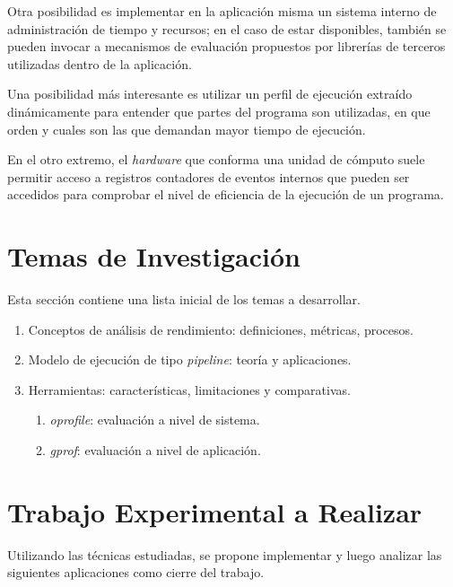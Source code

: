 \documentclass[a4paper]{article}
\begin{document}
\smallskip

Otra posibilidad es implementar en la aplicaci\'on misma un sistema interno de
administraci\'on de tiempo y recursos; en el caso de estar disponibles,
tambi\'en se pueden invocar a mecanismos de evaluaci\'on propuestos por
librer\'ias de terceros utilizadas dentro de la aplicaci\'on.

\smallskip

Una posibilidad m\'as interesante es utilizar un perfil de ejecuci\'on
extra\'ido din\'amicamente para entender que partes del programa son
utilizadas, en que orden y cuales son las que demandan mayor tiempo de
ejecuci\'on.

\smallskip

En el otro extremo, el {\it hardware} que conforma una unidad de c\'omputo
suele permitir acceso a registros contadores de eventos internos que pueden
ser accedidos para comprobar el nivel de eficiencia de la ejecuci\'on de un
programa.

\section{Temas de Investigaci\'on}

Esta secci\'on contiene una lista inicial de los temas a desarrollar.

\begin{enumerate}
\item Conceptos de an\'alisis de rendimiento: definiciones, m\'etricas,
  procesos.
\item Modelo de ejecuci\'on de tipo {\it pipeline}: teor\'ia y aplicaciones.
\item Herramientas: caracter\'isticas, limitaciones y comparativas.
\begin{enumerate}
\item {\it oprofile}: evaluaci\'on a nivel de sistema.
\item {\it gprof}: evaluaci\'on a nivel de aplicaci\'on.
\end{enumerate}
\end{enumerate}

\section{Trabajo Experimental a Realizar}

Utilizando las t\'ecnicas estudiadas, se propone implementar y luego analizar
las siguientes aplicaciones como cierre del trabajo.
\end{document}
